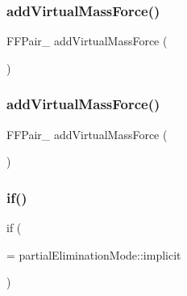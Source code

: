 \subsubsection{\texorpdfstring{add\+Virtual\+Mass\+Force()}{addVirtualMassForce()}\hspace{0.1cm}{\footnotesize\ttfamily [1/2]}}
{\footnotesize\ttfamily F\+F\+Pair\+\_\+ add\+Virtual\+Mass\+Force (\begin{DoxyParamCaption}\item[{\hyperlink{UEqns__2p_8H_aae13b369a8a095eff1fbd9502846e5ed}{U\+Eqn1}}]{ }\end{DoxyParamCaption})}

\mbox{\label{UEqns__2p_8H_a91493c7bfd156a6f4d2a7d1bad26fca6}} 
\subsubsection{\texorpdfstring{add\+Virtual\+Mass\+Force()}{addVirtualMassForce()}\hspace{0.1cm}{\footnotesize\ttfamily [2/2]}}
{\footnotesize\ttfamily F\+F\+Pair\+\_\+ add\+Virtual\+Mass\+Force (\begin{DoxyParamCaption}\item[{\hyperlink{UEqns__2p_8H_a22a244ef3f804b6129767149e4ff2e95}{U\+Eqn2}}]{ }\end{DoxyParamCaption})}

\mbox{\label{UEqns__2p_8H_af1e25f96fb77d3d5e95a4bfcfa302a5b}} 
\subsubsection{\texorpdfstring{if()}{if()}\hspace{0.1cm}{\footnotesize\ttfamily [2/3]}}
{\footnotesize\ttfamily if (\begin{DoxyParamCaption}\item[{partial\+Elimination\+Mode\+\_\+ !}]{ = {\ttfamily partialEliminationMode\+:\+:implicit} }\end{DoxyParamCaption})}



